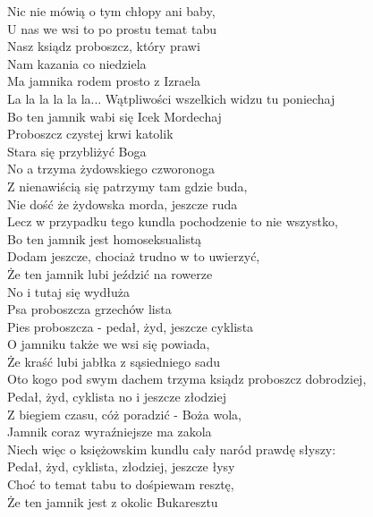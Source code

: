 
Nic nie mówią o tym chłopy ani baby, \\
U nas we wsi to po prostu temat tabu \\
Nasz ksiądz proboszcz, który prawi \\
Nam kazania co niedziela \tab{}\\
Ma jamnika rodem prosto z Izraela \\
La la la la la la... \tab{}
\hops
Wątpliwości wszelkich widzu tu poniechaj \\
Bo ten jamnik wabi się Icek Mordechaj \\
Proboszcz czystej krwi katolik \\
Stara się przybliżyć Boga \\
No a trzyma żydowskiego czworonoga \\
\hops
Z nienawiścią się patrzymy tam gdzie buda, \\
Nie dość że żydowska morda, jeszcze ruda \\
Lecz w przypadku tego kundla pochodzenie to nie wszystko, \\
Bo ten jamnik jest homoseksualistą \\
\hops
Dodam jeszcze, chociaż trudno w to uwierzyć, \\
Że ten jamnik lubi jeździć na rowerze \\
No i tutaj się wydłuża \\
Psa proboszcza grzechów lista \\
Pies proboszcza - pedał, żyd, jeszcze cyklista \\
\hops
O jamniku także we wsi się powiada, \\
Że kraść lubi jabłka z sąsiedniego sadu \\
Oto kogo pod swym dachem trzyma ksiądz proboszcz dobrodziej, \\
Pedał, żyd, cyklista no i jeszcze złodziej \\
\hops
Z biegiem czasu, cóż poradzić - Boża wola, \\
Jamnik coraz wyraźniejsze ma zakola \\
Niech więc o księżowskim kundlu cały naród prawdę słyszy: \\
Pedał, żyd, cyklista, złodziej, jeszcze łysy \\
\hops
Choć to temat tabu to dośpiewam resztę, \\
Że ten jamnik jest z okolic Bukaresztu \\
